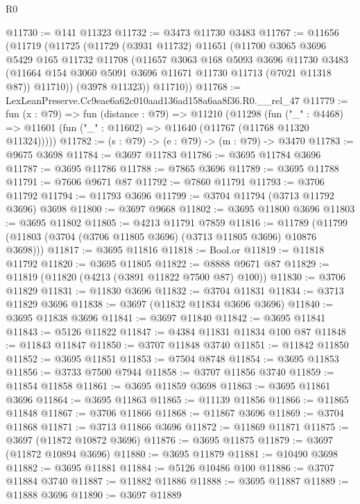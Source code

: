 \begin{lexlean}{R0}
\begin{coremodule}
@11730 := @141 @11323
@11732 := @3473 @11730 @3483
@11767 := @11656
    (@11719
      (@11725
        (@11729
          (@3931 @11732)
          @11651
          (@11700
            @3065
            @3696
            @5429
            @165
            @11732
            @11708
            (@11657
              @3063
              @168
              @5093
              @3696
              @11730
              @3483
              (@11664 @154 @3060 @5091 @3696 @11671 @11730 @11713 (@7021 @11318 @87))
              @11710))
          (@3978 @11323))
        @11710))
@11768 := LexLeanPreserve.Cc9eae6a62c010aad136ad158a6aa8f36.R0.__rel_47
@11779 := fun (x : @79) =>
  fun (distance : @79) =>
  @11210
    (@11298
      (fun ("_" : @4468) => @11601 (fun ("_" : @11602) => @11640 (@11767 (@11768 @11320 @11324)))))
@11782 := (s : @79) -> (e : @79) -> (m : @79) -> @3470
@11783 := @9675 @3698
@11784 := @3697 @11783
@11786 := @3695 @11784 @3696
@11787 := @3695 @11786
@11788 := @7865 @3696
@11789 := @3695 @11788
@11791 := @7606 @9671 @87
@11792 := @7860 @11791
@11793 := @3706 @11792
@11794 := @11793 @3696
@11799 := @3704 @11794 (@3713 @11792 @3696) @3698
@11800 := @3697 @9668
@11802 := @3695 @11800 @3696
@11803 := @3695 @11802
@11805 := @4213 @11791 @7859
@11816 := @11789 (@11799 (@11803 (@3704 (@3706 @11805 @3696) (@3713 @11805 @3696) @10876 @3698)))
@11817 := @3695 @11816
@11818 := Bool.or
@11819 := @11818 @11792
@11820 := @3695 @11805
@11822 := @8888 @9671 @87
@11829 := @11819 (@11820 (@4213 (@3891 @11822 @7500 @87) @100))
@11830 := @3706 @11829
@11831 := @11830 @3696
@11832 := @3704 @11831
@11834 := @3713 @11829 @3696
@11838 := @3697 (@11832 @11834 @3696 @3696)
@11840 := @3695 @11838 @3696
@11841 := @3697 @11840
@11842 := @3695 @11841
@11843 := @5126 @11822
@11847 := @4384 @11831 @11834 @100 @87
@11848 := @11843 @11847
@11850 := @3707 @11848 @3740
@11851 := @11842 @11850
@11852 := @3695 @11851
@11853 := @7504 @8748
@11854 := @3695 @11853
@11856 := @3733 @7500 @7944
@11858 := @3707 @11856 @3740
@11859 := @11854 @11858
@11861 := @3695 @11859 @3698
@11863 := @3695 @11861 @3696
@11864 := @3695 @11863
@11865 := @11139 @11856
@11866 := @11865 @11848
@11867 := @3706 @11866
@11868 := @11867 @3696
@11869 := @3704 @11868
@11871 := @3713 @11866 @3696
@11872 := @11869 @11871
@11875 := @3697 (@11872 @10872 @3696)
@11876 := @3695 @11875
@11879 := @3697 (@11872 @10894 @3696)
@11880 := @3695 @11879
@11881 := @10490 @3698
@11882 := @3695 @11881
@11884 := @5126 @10486 @100
@11886 := @3707 @11884 @3740
@11887 := @11882 @11886
@11888 := @3695 @11887
@11889 := @11888 @3696
@11890 := @3697 @11889

\end{coremodule}
\end{lexlean}
